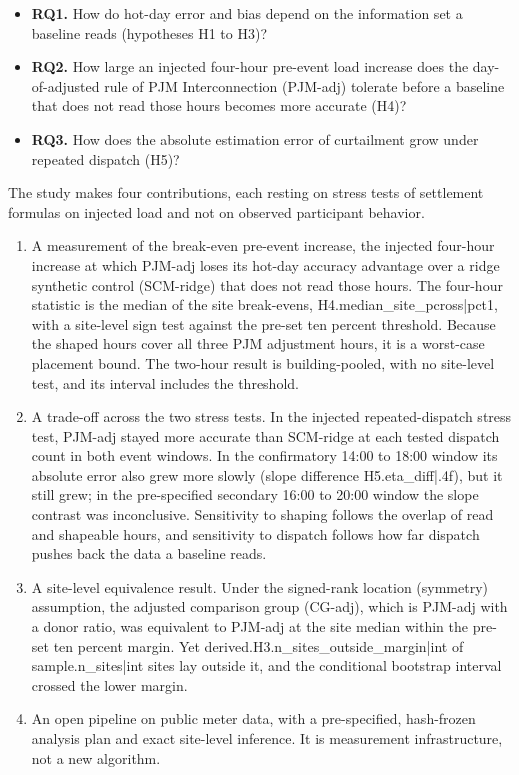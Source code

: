 \begin{itemize}
\item \textbf{RQ1.} How do hot-day error and bias depend on the information set a baseline reads (hypotheses H1 to H3)?
\item \textbf{RQ2.} How large an injected four-hour pre-event load increase does the day-of-adjusted rule of PJM Interconnection (PJM-adj) tolerate before a baseline that does not read those hours becomes more accurate (H4)?
\item \textbf{RQ3.} How does the absolute estimation error of curtailment grow under repeated dispatch (H5)?
\end{itemize}

The study makes four contributions, each resting on stress tests of settlement formulas on injected load and not on observed participant behavior.

\begin{enumerate}
\item[(i)] A measurement of the break-even pre-event increase, the injected four-hour increase at which PJM-adj loses its hot-day accuracy advantage over a ridge synthetic control (SCM-ridge) that does not read those hours. The four-hour statistic is the median of the site break-evens, {{H4.median_site_pcross|pct1}}, with a site-level sign test against the pre-set ten percent threshold. Because the shaped hours cover all three PJM adjustment hours, it is a worst-case placement bound. The two-hour result is building-pooled, with no site-level test, and its interval includes the threshold.
\item[(ii)] A trade-off across the two stress tests. In the injected repeated-dispatch stress test, PJM-adj stayed more accurate than SCM-ridge at each tested dispatch count in both event windows. In the confirmatory 14:00 to 18:00 window its absolute error also grew more slowly (slope difference {{H5.eta_diff|.4f}}), but it still grew; in the pre-specified secondary 16:00 to 20:00 window the slope contrast was inconclusive. Sensitivity to shaping follows the overlap of read and shapeable hours, and sensitivity to dispatch follows how far dispatch pushes back the data a baseline reads.
\item[(iii)] A site-level equivalence result. Under the signed-rank location (symmetry) assumption, the adjusted comparison group (CG-adj), which is PJM-adj with a donor ratio, was equivalent to PJM-adj at the site median within the pre-set ten percent margin. Yet {{derived.H3.n_sites_outside_margin|int}} of {{sample.n_sites|int}} sites lay outside it, and the conditional bootstrap interval crossed the lower margin.
\item[(iv)] An open pipeline on public meter data, with a pre-specified, hash-frozen analysis plan and exact site-level inference. It is measurement infrastructure, not a new algorithm.
\end{enumerate}


